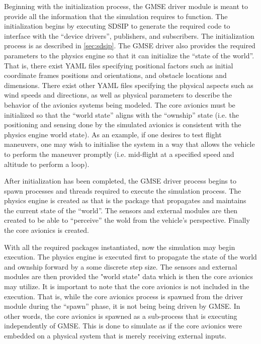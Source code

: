 Beginning with the initialization process, the GMSE driver module is meant to provide all the
information that the simulation requires to function. The initialization begins by executing SDSIP
to generate the required code to interface with the ``device drivers'', publishers, and subscribers.
The initialization process is as described in \autoref{sec:sdsip}. The GMSE driver also provides
the required parameters to the physics engine so that it can initialize the ``state of the world''.
That is, there exist YAML files specifying positional factors such as initial coordinate frames
positions and orientations, and obstacle locations and dimensions. There exist other YAML files
specifying the physical aspects such as wind speeds and directions, as well as physical parameters
to describe the behavior of the avionics systems being modeled. The core avionics must be
initialized so that the ``world state'' aligns with the ``ownship'' state (i.e. the positioning and
sensing done by the simulated avionics is consistent with the physics engine world state). As an
example, if one desires to test flight maneuvers, one may wish to initialise the system in a way
that allows the vehicle to perform the maneuver promptly (i.e. mid-flight at a specified speed and
altitude to perform a loop).

After initialization has been completed, the GMSE driver process begins to spawn processes and
threads required to execute the simulation process. The physics engine is created as that is the
package that propagates and maintains the current state of the ``world''. The sensors and external
modules are then created to be able to ``perceive'' the wold from the vehicle's perspective. Finally
the core avionics is created.

With all the required packages instantiated, now the simulation may begin execution. The physics
engine is executed first to propagate the state of the world and ownship forward by a some discrete
step size. The sensors and external modules are then provided the "world state" data which is then
the core avionics may utilize. It is important to note that the core avionics is not included in the
execution. That is, while the core avionics process is spawned from the driver module during the
``spawn'' phase, it is not being being driven by GMSE. In other words, the core avionics is spawned
as a sub-process that is executing independently of GMSE. This is done to simulate as if the core
avionics were embedded on a physical system that is merely receiving external inputs.

